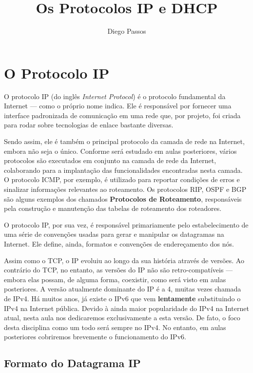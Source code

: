 \documentclass{article}
\title{Os Protocolos IP e DHCP}
\author{Diego Passos}
\date{}  %
\begin{document}
\maketitle%

\section{O Protocolo IP}

O protocolo IP (do inglês \textit{Internet Protocol}) é o protocolo fundamental da Internet --- como o próprio nome indica. Ele é responsável por fornecer uma interface padronizada de comunicação em uma rede que, por projeto, foi criada para rodar sobre tecnologias de enlace bastante diversas.

Sendo assim, ele é também o principal protocolo da camada de rede na Internet, embora não seja o único. Conforme será estudado em aulas posteriores, vários protocolos são executados em conjunto na camada de rede da Internet, colaborando para a implantação das funcionalidades encontradas nesta camada. O protocolo ICMP, por exemplo, é utilizado para reportar condições de erros e sinalizar informações relevantes ao roteamento. Os protocolos RIP, OSPF e BGP são alguns exemplos dos chamados \textbf{Protocolos de Roteamento}, responsáveis pela construção e manutenção das tabelas de roteamento dos roteadores.

O protocolo IP, por sua vez, é responsável primariamente pelo estabelecimento de uma série de convenções usadas para gerar e manipular os datagramas na Internet. Ele define, ainda, formatos e convenções de endereçamento dos nós.

Assim como o TCP, o IP evoluiu ao longo da sua história através de versões. Ao contrário do TCP, no entanto, as versões do IP não são retro-compatíveis --- embora elas possam, de alguma forma, coexistir, como será visto em aulas posteriores. A versão atualmente dominante do IP é a 4, muitas vezes chamada de IPv4. Há muitos anos, já existe o IPv6 que vem \textbf{lentamente} substituindo o IPv4 na Internet pública. Devido à ainda maior popularidade do IPv4 na Internet atual, nesta aula nos dedicaremos exclusivamente a esta versão. De fato, o foco desta disciplina como um todo será sempre no IPv4. No entanto, em aulas posteriores cobriremos brevemente o funcionamento do IPv6.

\subsection{Formato do Datagrama IP}
\end{document}
